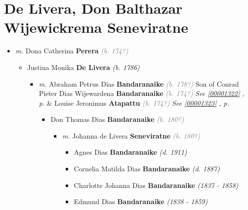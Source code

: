 \documentclass[10pt, openany]{book}
\begin{document}
\chapter{De Livera, Don Balthazar Wijewickrema Seneviratne}
\label{00001177}
\textcolor{slmaroon}{\textit{}}
\begin{itemize}
\item{\textit{m.} Dona Catherina \textbf{Perera} \textcolor{gray}{\textit{(b. 174?)}}   \label{couple:00001177:00001178} \begin{itemize}
\item{Justina Monika \textbf{De Livera} \textcolor{slorange}{\textit{(b. 1786)}}
\begin{itemize}
\item{\textit{m.} Abraham Petrus Dias \textbf{Bandaranaike} \textcolor{gray}{\textit{(b. 178?)}} Son of  Conrad Pieter Dias Wijewardena \textbf{Bandaranaike} \textcolor{gray}{\textit{(b. 174?)}} \textcolor{slteal}{\textit{See  \autoref{00001322} \textit{, p. \pageref{00001322} }}}  \&  Louise Jeronimus \textbf{Atapattu} \textcolor{gray}{\textit{(b. 174?)}} \textcolor{slteal}{\textit{See  \autoref{00001323} \textit{, p. \pageref{00001323} }}}   \label{couple:00001182:00001183} \begin{itemize}
\item{Don Thomas Dias \textbf{Bandaranaike} \textcolor{gray}{\textit{(b. 180?)}}
\begin{itemize}
\item{\textit{m.} Johanna de Livera \textbf{Seneviratne} \textcolor{gray}{\textit{(b. 180?)}}   \label{couple:00001185:00001186} \begin{itemize}
\item{Agnes Dias \textbf{Bandaranaike} \textcolor{slorange}{\textit{(d. 1911)}}
  }
\item{Cornelia Matilda Dias \textbf{Bandaranaike} \textcolor{slorange}{\textit{(d. 1887)}}
   }
\item{Charlotte Johanna Dias \textbf{Bandaranaike} \textcolor{slorange}{\textit{(1837 - 1858)}}
   }
\item{Edmund Dias \textbf{Bandaranaike} \textcolor{slorange}{\textit{(1838 - 1859)}}
  }
\end{itemize}}
\end{itemize}
   }

\end{itemize}}
\end{itemize}}
\end{itemize}}
\end{itemize}
\end{document}
